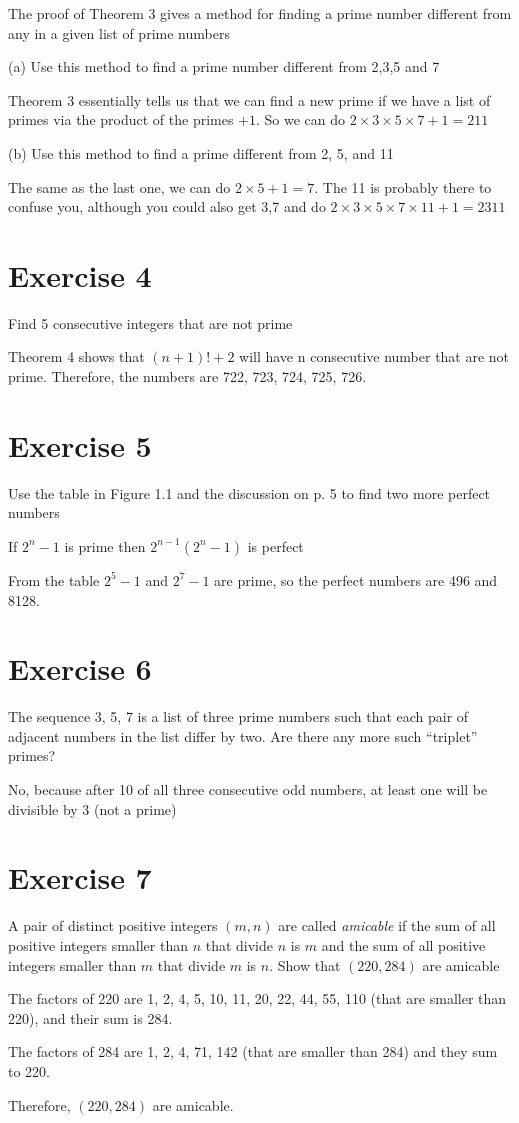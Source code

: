 \documentclass[11pt]{article}
\begin{document}
\noindent The proof of Theorem 3 gives a method for finding a prime number different from any in a given list of prime numbers

\noindent (a) Use this method to find a prime number different from 2,3,5 and 7

Theorem 3 essentially tells us that we can find a new prime if we have a list of primes via the product of the primes $+1$. So we can do $2 \times 3 \times 5 \times 7 + 1= 211$

\noindent (b) Use this method to find a prime different from 2, 5, and 11

The same as the last one, we can do $2 \times 5 + 1 = 7$. The 11 is probably there to confuse you, although you could also get 3,7 and do $2 \times 3 \times 5 \times 7 \times 11 + 1 = 2311$

\section*{Exercise 4}

\noindent Find 5 consecutive integers that are not prime

Theorem 4 shows that $(n+1)! + 2$ will have n consecutive number that are not prime. Therefore, the numbers are 722, 723, 724, 725, 726.

\section*{Exercise 5}

\noindent Use the table in Figure 1.1 and the discussion on p. 5 to find two more perfect numbers

If $2^n -1$ is prime then $2^{n-1}(2^n-1)$ is perfect

From the table $2^5 -1$ and $2^7 -1$ are prime, so the perfect numbers are 496 and 8128.

\section*{Exercise 6}

\noindent The sequence 3, 5, 7 is a list of three prime numbers such that each pair of adjacent numbers in the list differ by two. Are there any more such ``triplet'' primes?

No, because after 10 of all three consecutive odd numbers, at least one will be divisible by 3 (not a prime)

\section*{Exercise 7}

\noindent A pair of distinct positive integers $(m, n)$ are called \textit{amicable} if the sum of all positive integers smaller than $n$ that divide $n$ is $m$ and the sum of all positive integers smaller than $m$ that divide $m$ is $n$. Show that $(220, 284)$ are amicable

The factors of 220 are 1, 2, 4, 5, 10, 11, 20, 22, 44, 55, 110 (that are smaller than 220), and their sum is 284.

The factors of 284 are 1, 2, 4, 71, 142 (that are smaller than 284) and they sum to 220.

Therefore, $(220, 284)$ are amicable.
\end{document}
